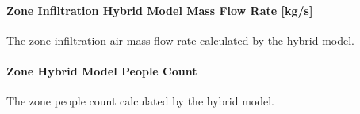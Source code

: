 \paragraph{Zone Infiltration Hybrid Model Mass Flow Rate {[}kg/s{]}}\label{zone-infiltration-hybrid-model-air-mass-flow-rate}

The zone infiltration air mass flow rate calculated by the hybrid model.

\paragraph{Zone Hybrid Model People Count}\label{zone-infiltration-hybrid-model-people-count}

The zone people count calculated by the hybrid model.